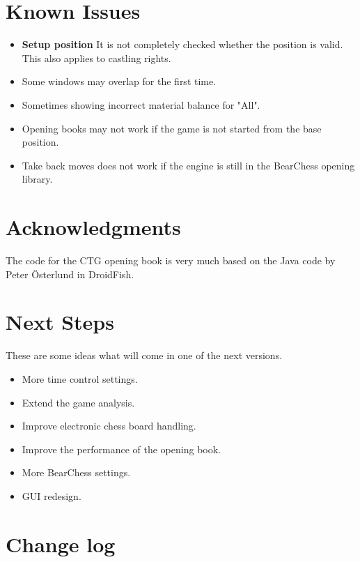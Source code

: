 \documentclass[11pt,a4paper]{article}
\begin{document}
\section{Known Issues}
\begin{itemize}
    \item \textbf{Setup position} It is not completely checked whether the position is valid. This also applies to castling rights.
	\item Some windows may overlap for the first time.
	\item Sometimes showing incorrect material balance for "All".
	\item Opening books may not work if the game is not started from the base position.	
	\item Take back moves does not work if the engine is still in the BearChess opening library.
\end{itemize}

\section{Acknowledgments}
The code for the CTG opening book is very much based on the Java code by Peter Österlund in DroidFish.

\section{Next Steps}

These are some ideas what will come in one of the next versions.

\begin{itemize}		
	    \item More time control settings.
		\item Extend the game analysis.
		\item Improve electronic chess board handling.
  	    \item Improve the performance of the opening book.
    	\item More BearChess settings.
   		\item GUI redesign.
\end{itemize} 

\pagebreak

\listoffigures

\pagebreak

\section{Change log}
\end{document}

